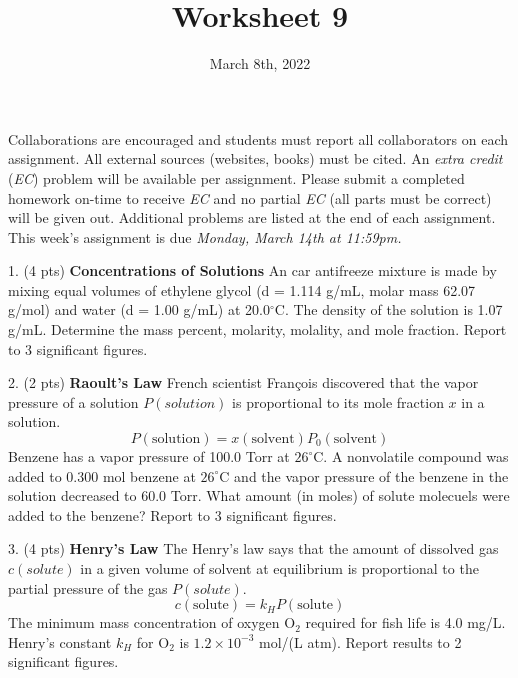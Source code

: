 \documentclass[11pt]{article}
\title{\textbf{Worksheet 9}}
\date{\vspace{-2em}March 8th, 2022}
\begin{document}
\maketitle

Collaborations are encouraged and students must report all collaborators
on each assignment. All external sources (websites, books) must be
cited. An \textit{extra credit} (\textit{EC}) problem will be available per
assignment. Please submit a completed homework on-time to receive \textit{EC}
and no partial \textit{EC} (all parts must be correct) will be given out.
Additional problems are listed at the end of each assignment. This week's
assignment is due \textit{Monday, March 14th at 11:59pm.}

1. (4 pts) \textbf{Concentrations of Solutions} An car antifreeze mixture is made by mixing
equal volumes of ethylene glycol (d = 1.114 g/mL, molar mass 62.07 g/mol) and water
(d = 1.00 g/mL) at 20.0$^\circ$C. The density of the solution is 1.07 g/mL. Determine
the mass percent, molarity, molality, and mole fraction. Report to 3 significant figures.


\vspace{2in}

2. (2 pts) \textbf{Raoult's Law} French scientist Fran\c{c}ois discovered that the vapor pressure
of a solution $P(solution)$ is proportional to its mole fraction $x$ in a solution.
\begin{equation}
  P(\text{solution}) = x(\text{solvent})P_0(\text{solvent})
\end{equation}
Benzene has a vapor pressure of 100.0 Torr at $26^\circ$C. A nonvolatile compound was added
to 0.300 mol benzene at $26^\circ$C and the vapor pressure of the benzene in the solution
decreased to 60.0 Torr. What amount (in moles) of solute molecuels were added to the benzene?
Report to 3 significant figures.

\vspace{2in}

3. (4 pts) \textbf{Henry's Law} The Henry's law says that the amount of dissolved gas
$c(solute)$ in a given volume of solvent at equilibrium is proportional to the partial
pressure of the gas $P(solute)$. 
\begin{equation}
  c(\text{solute}) = k_HP(\text{solute})
\end{equation}
The minimum mass concentration of oxygen O$_2$ required for fish life is 4.0 mg/L.
Henry's constant $k_H$ for O$_2$ is $1.2\times 10^{-3}$ mol/(L atm). Report results to 2
significant figures.
\end{document}
